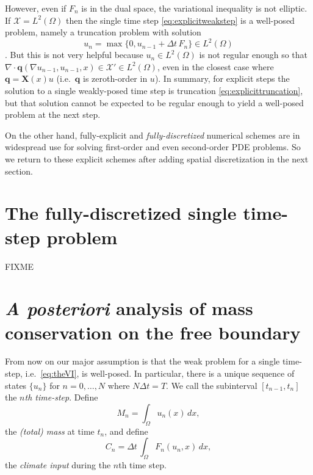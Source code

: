 \documentclass[final,leqno,onefignum,onetabnum]{siamltex1213bueler}
\newcommand\bq{\mathbf{q}}
\newcommand\bX{\mathbf{X}}
\newcommand{\Div}{\nabla\cdot}
\renewcommand{\grad}{\nabla}
\begin{document}
However, even if $F_n$ is in the dual space, the variational inequality is not elliptic.  If $\mathcal{X}=L^2(\Omega)$ then the single time step \eqref{eq:explicitweakstep} is a well-posed problem, namely a truncation problem with solution
\begin{equation}
u_n = \max\{0,u_{n-1} + \Delta t\,F_n\} \in L^2(\Omega)  \label{eq:explicittruncation}
\end{equation}
\cite[page 27]{KinderlehrerStampacchia}.  But this is not very helpful because $u_n \in L^2(\Omega)$ is not regular enough so that $\Div \bq(\grad u_{n-1},u_{n-1},x) \in \mathcal{X}' \in L^2(\Omega)$, even in the closest case where $\bq = \bX(x) u$ (i.e.~$\bq$ is zeroth-order in $u$).  In summary, for explicit steps the solution to a single weakly-posed time step is truncation \eqref{eq:explicittruncation}, but that solution cannot be expected to be regular enough to yield a well-posed problem at the next step.

On the other hand, fully-explicit and \emph{fully-discretized} numerical schemes are in widespread use for solving first-order and even second-order PDE problems.  So we return to these explicit schemes after adding spatial discretization in the next section.


\section{The fully-discretized single time-step problem}  \label{sec:spacediscretized} FIXME


\section{\emph{A posteriori} analysis of mass conservation on the free boundary}  \label{sec:timeseries}

From now on our major assumption is that the weak problem for a single time-step, i.e.~\eqref{eq:theVI}, is well-posed.  In particular, there is a unique sequence of states $\{u_n\}$ for $n=0,\dots,N$ where $N\Delta t = T$.  We call the subinterval $[t_{n-1},t_n]$ the \emph{$n$th time-step}.  Define
\begin{equation}
M_n = \int_\Omega u_n(x)\,dx, \label{eq:totalmassseries}
\end{equation}
the \emph{(total) mass} at time $t_n$, and define
\begin{equation}
C_n = \Delta t\, \int_\Omega F_n(u_n,x)\,dx, \label{eq:climateseries}
\end{equation}
the \emph{climate input} during the $n$th time step.
\end{document}
